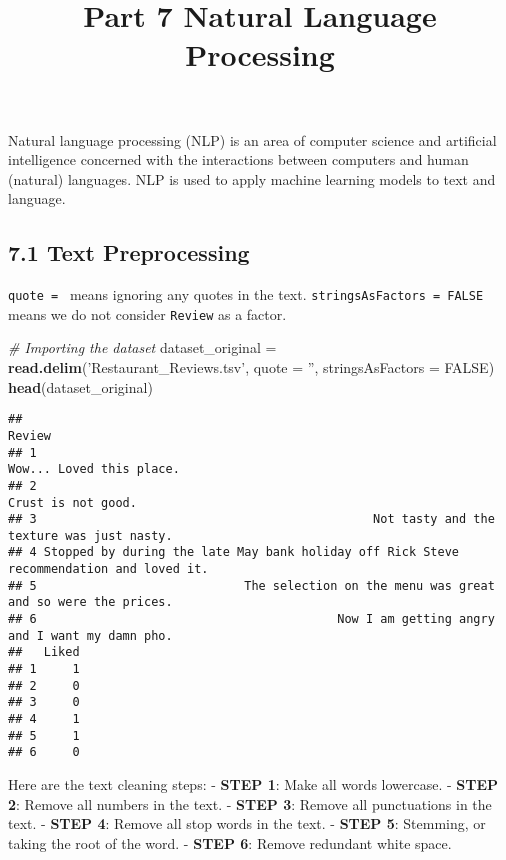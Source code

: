 \documentclass[]{article}
\title{Part 7 Natural Language Processing}
\author{}
\date{}
\newenvironment{Shaded}{\begin{snugshade}}{\end{snugshade}}
\newcommand{\CommentTok}[1]{\textcolor[rgb]{0.56,0.35,0.01}{\textit{#1}}}
\newcommand{\DataTypeTok}[1]{\textcolor[rgb]{0.13,0.29,0.53}{#1}}
\newcommand{\KeywordTok}[1]{\textcolor[rgb]{0.13,0.29,0.53}{\textbf{#1}}}
\newcommand{\NormalTok}[1]{#1}
\newcommand{\OtherTok}[1]{\textcolor[rgb]{0.56,0.35,0.01}{#1}}
\newcommand{\StringTok}[1]{\textcolor[rgb]{0.31,0.60,0.02}{#1}}
\begin{document}
\maketitle

Natural language processing (NLP) is an area of computer science and
artificial intelligence concerned with the interactions between
computers and human (natural) languages. NLP is used to apply machine
learning models to text and language.

\hypertarget{text-preprocessing}{%
\subsection{7.1 Text Preprocessing}\label{text-preprocessing}}

\texttt{quote\ =\ \textquotesingle{}\textquotesingle{}} means ignoring
any quotes in the text. \texttt{stringsAsFactors\ =\ FALSE} means we do
not consider \texttt{Review} as a factor.

\begin{Shaded}
\begin{Highlighting}[]
\CommentTok{# Importing the dataset}
\NormalTok{dataset_original =}\StringTok{ }\KeywordTok{read.delim}\NormalTok{(}\StringTok{'Restaurant_Reviews.tsv'}\NormalTok{, }\DataTypeTok{quote =} \StringTok{''}\NormalTok{, }\DataTypeTok{stringsAsFactors =} \OtherTok{FALSE}\NormalTok{)}
\KeywordTok{head}\NormalTok{(dataset_original)}
\end{Highlighting}
\end{Shaded}

\begin{verbatim}
##                                                                                    Review
## 1                                                                Wow... Loved this place.
## 2                                                                      Crust is not good.
## 3                                               Not tasty and the texture was just nasty.
## 4 Stopped by during the late May bank holiday off Rick Steve recommendation and loved it.
## 5                             The selection on the menu was great and so were the prices.
## 6                                          Now I am getting angry and I want my damn pho.
##   Liked
## 1     1
## 2     0
## 3     0
## 4     1
## 5     1
## 6     0
\end{verbatim}

Here are the text cleaning steps: - \textbf{STEP 1}: Make all words
lowercase. - \textbf{STEP 2}: Remove all numbers in the text. -
\textbf{STEP 3}: Remove all punctuations in the text. - \textbf{STEP 4}:
Remove all stop words in the text. - \textbf{STEP 5}: Stemming, or
taking the root of the word. - \textbf{STEP 6}: Remove redundant white
space.
\end{document}
